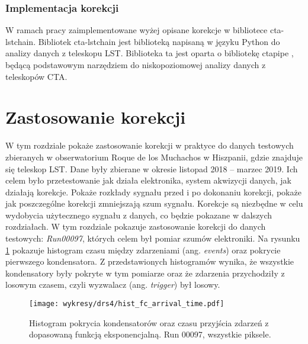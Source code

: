\documentclass[a4paper,11pt,twoside]{article}
\begin{document}
\subsubsection{Implementacja korekcji}
W ramach pracy zaimplementowane wyżej opisane korekcje w bibliotece cta-lstchain. Bibliotek cta-lstchain \cite{lstchain_url} jest biblioteką napisaną w języku Python do analizy danych z teleskopu LST. Biblioteka ta jest oparta o bibliotekę ctapipe \cite{ctapipe_url}, będącą podstawowym narzędziem do niskopoziomowej analizy danych z teleskopów CTA.


\newpage
\section{Zastosowanie korekcji}
W tym rozdziale pokaże zastosowanie korekcji w praktyce do danych testowych zbieranych w obserwatorium Roque de los Muchachos w Hiszpanii, gdzie znajduje się teleskop LST. Dane były zbierane w okresie listopad 2018 -- marzec 2019. Ich celem było przetestowanie jak działa elektronika, system akwizycji danych, jak działają korekcje. Pokaże rozkłady sygnału przed i po dokonaniu korekcji, pokaże jak poszczególne korekcji zmniejszają szum sygnału. Korekcje są niezbędne w celu wydobycia użytecznego sygnału z danych, co będzie pokazane w dalszych rozdziałach. W tym rozdziale pokazuje zastosowanie korekcji do danych testowych: \textsl{Run00097}, których celem był pomiar szumów elektroniki. Na rysunku \ref{fig:data_hist} pokazuje histogram czasu między zdarzeniami (ang. \textsl{events}) oraz pokrycie pierwszego kondensatora. Z przedstawionych histogramów wynika, że wszystkie kondensatory były pokryte w tym pomiarze oraz że zdarzenia przychodziły z losowym czasem, czyli wyzwalacz (ang. \textsl{trigger}) był losowy. 
\begin{figure}[H] 
\centering
\texttt{[image: wykresy/drs4/hist\_fc\_arrival\_time.pdf]}
\caption{Histogram pokrycia kondensatorów oraz czasu przyjścia zdarzeń z dopasowaną funkcją eksponencjalną. Run 00097, wszystkie piksele.}
\label{fig:data_hist}
\end{figure}
\end{document}
